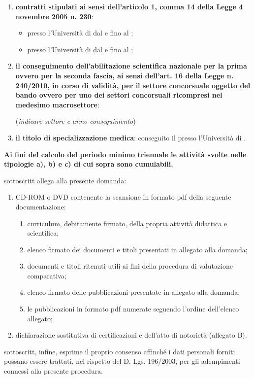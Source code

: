 \begin{enumerate}
\begin{itemize}
\end{itemize}
\item \textbf{contratti stipulati ai sensi dell’articolo 1, comma 14 della 
Legge 4 novembre 2005 n. 230}:
\begin{itemize}
 \item presso l’Università di \myTextField[4.5cm]{} dal \myTextField{} e fino 
 al \myTextField{};
 \item presso l’Università di \myTextField[4.5cm]{} dal \myTextField{} e fino 
 al \myTextField{};
\end{itemize}
\item \textbf{il conseguimento dell’abilitazione scientifica nazionale per la 
prima ovvero per la seconda fascia, ai sensi dell’art. 16 della Legge n. 
240/2010, in corso di validità, per il settore concorsuale oggetto del bando 
ovvero per uno dei settori concorsuali ricompresi nel medesimo macrosettore}:

(\emph{indicare settore e anno conseguimento}) \myTextField{}
\item \textbf{il titolo di specializzazione medica}: conseguito il \myTextField{} 
presso l’Università di  \myTextField{}.
\end{enumerate}
\textbf{Ai fini del calcolo del periodo minimo triennale le attività svolte 
nelle tipologie a), b) e c) di cui sopra sono cumulabili.}

\myTextField[.5cm]{} sottoscritt\myTextField[.5cm]{} allega alla presente 
domanda:
\begin{enumerate}
\item CD-ROM o DVD contenente la scansione in formato pdf della seguente 
documentazione:
\begin{enumerate}[label=\emph{\roman*})]
\item curriculum, debitamente firmato, della propria attività didattica e scientifica;
\item elenco firmato dei documenti e titoli presentati in allegato alla domanda;
\item documenti e titoli ritenuti utili ai fini della procedura di valutazione 
comparativa;
\item elenco firmato delle pubblicazioni presentate in allegato alla domanda;
\item le pubblicazioni in formato pdf numerate seguendo l’ordine dell’elenco 
allegato;
\end{enumerate}
\item 	dichiarazione sostitutiva di certificazioni e dell’atto di notorietà 
(allegato B).
\end{enumerate}
\myTextField[.5cm]{} sottoscritt\myTextField[.5cm]{}, infine, esprime il proprio 
consenso affinché i dati personali forniti possano essere trattati, nel rispetto 
del D. Lgs. 196/2003, per gli adempimenti connessi alla presente procedura.
